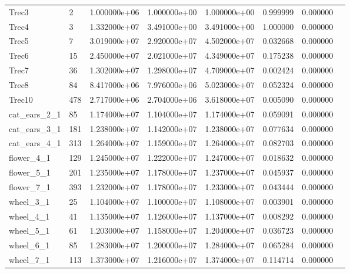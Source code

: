 \begin{tabular}{llrrrrrr}
Trec3                   &    2 &  1.000000e+06 &  1.000000e+00 &  1.000000e+00 &  0.999999 &  0.000000 \\
Trec4                   &    3 &  1.332000e+07 &  3.491000e+00 &  3.491000e+00 &  1.000000 &  0.000000 \\
Trec5                   &    7 &  3.019000e+07 &  2.920000e+07 &  4.502000e+07 &  0.032668 &  0.000000 \\
Trec6                   &   15 &  2.450000e+07 &  2.021000e+07 &  4.349000e+07 &  0.175238 &  0.000000 \\
Trec7                   &   36 &  1.302000e+07 &  1.298000e+07 &  4.709000e+07 &  0.002424 &  0.000000 \\
Trec8                   &   84 &  8.417000e+06 &  7.976000e+06 &  5.023000e+07 &  0.052324 &  0.000000 \\
Trec10                  &  478 &  2.717000e+06 &  2.704000e+06 &  3.618000e+07 &  0.005090 &  0.000000 \\
cat\_ears\_2\_1            &   85 &  1.174000e+07 &  1.104000e+07 &  1.174000e+07 &  0.059091 &  0.000000 \\
cat\_ears\_3\_1            &  181 &  1.238000e+07 &  1.142000e+07 &  1.238000e+07 &  0.077634 &  0.000000 \\
cat\_ears\_4\_1            &  313 &  1.264000e+07 &  1.159000e+07 &  1.264000e+07 &  0.082703 &  0.000000 \\
flower\_4\_1              &  129 &  1.245000e+07 &  1.222000e+07 &  1.247000e+07 &  0.018632 &  0.000000 \\
flower\_5\_1              &  201 &  1.235000e+07 &  1.178000e+07 &  1.237000e+07 &  0.045937 &  0.000000 \\
flower\_7\_1              &  393 &  1.232000e+07 &  1.178000e+07 &  1.233000e+07 &  0.043444 &  0.000000 \\
wheel\_3\_1               &   25 &  1.104000e+07 &  1.100000e+07 &  1.108000e+07 &  0.003901 &  0.000000 \\
wheel\_4\_1               &   41 &  1.135000e+07 &  1.126000e+07 &  1.137000e+07 &  0.008292 &  0.000000 \\
wheel\_5\_1               &   61 &  1.203000e+07 &  1.158000e+07 &  1.204000e+07 &  0.036723 &  0.000000 \\
wheel\_6\_1               &   85 &  1.283000e+07 &  1.200000e+07 &  1.284000e+07 &  0.065284 &  0.000000 \\
wheel\_7\_1               &  113 &  1.373000e+07 &  1.216000e+07 &  1.374000e+07 &  0.114714 &  0.000000 \\

\end{tabular}
